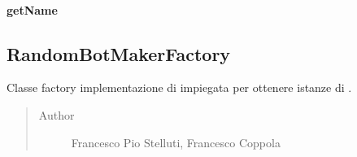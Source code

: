 \documentclass[letterpaper,10pt,italian,openany,oneside]{sphinxmanual}
\begin{document}
\paragraph{getName}
\label{\detokenize{source/it/unicam/cs/pa/mastermind/factories/RandomBotBreakerFactory:getname}}

\begin{fulllineitems}
\label{\detokenize{source/it/unicam/cs/pa/mastermind/factories/RandomBotBreakerFactory:it.unicam.cs.pa.mastermind.factories.RandomBotBreakerFactory.getName()}}
\end{fulllineitems}



\subsection{RandomBotMakerFactory}
\label{\detokenize{source/it/unicam/cs/pa/mastermind/factories/RandomBotMakerFactory:randombotmakerfactory}}\label{\detokenize{source/it/unicam/cs/pa/mastermind/factories/RandomBotMakerFactory::doc}}

\begin{fulllineitems}
\label{\detokenize{source/it/unicam/cs/pa/mastermind/factories/RandomBotMakerFactory:it.unicam.cs.pa.mastermind.factories.RandomBotMakerFactory}}
Classe factory implementazione di  impiegata per ottenere istanze di .
\begin{quote}\begin{description}
\item[{Author}] \leavevmode
Francesco Pio Stelluti, Francesco Coppola

\end{description}\end{quote}

\end{fulllineitems}
\end{document}
